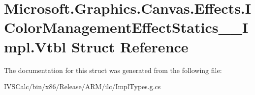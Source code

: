 \hypertarget{struct_microsoft_1_1_graphics_1_1_canvas_1_1_effects_1_1_i_color_management_effect_statics_____impl_1_1_vtbl}{}\section{Microsoft.\+Graphics.\+Canvas.\+Effects.\+I\+Color\+Management\+Effect\+Statics\+\_\+\+\_\+\+Impl.\+Vtbl Struct Reference}
\label{struct_microsoft_1_1_graphics_1_1_canvas_1_1_effects_1_1_i_color_management_effect_statics_____impl_1_1_vtbl}


The documentation for this struct was generated from the following file\+:\begin{DoxyCompactItemize}
\item 
I\+V\+S\+Calc/bin/x86/\+Release/\+A\+R\+M/ilc/Impl\+Types.\+g.\+cs\end{DoxyCompactItemize}

